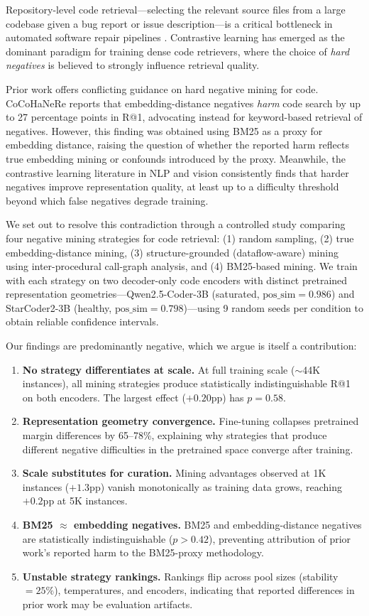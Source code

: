 \documentclass[11pt,a4paper]{article}
\begin{document}
Repository-level code retrieval---selecting the relevant source files from a large codebase given a bug report or issue description---is a critical bottleneck in automated software repair pipelines \cite{jimenez2024swebench}.
Contrastive learning has emerged as the dominant paradigm for training dense code retrievers, where the choice of \emph{hard negatives} is believed to strongly influence retrieval quality.

Prior work offers conflicting guidance on hard negative mining for code.
CoCoHaNeRe reports that embedding-distance negatives \emph{harm} code search by up to 27 percentage points in R@1, advocating instead for keyword-based retrieval of negatives.
However, this finding was obtained using BM25 as a proxy for embedding distance, raising the question of whether the reported harm reflects true embedding mining or confounds introduced by the proxy.
Meanwhile, the contrastive learning literature in NLP and vision consistently finds that harder negatives improve representation quality, at least up to a difficulty threshold beyond which false negatives degrade training.

We set out to resolve this contradiction through a controlled study comparing four negative mining strategies for code retrieval: (1) random sampling, (2) true embedding-distance mining, (3) structure-grounded (dataflow-aware) mining using inter-procedural call-graph analysis, and (4) BM25-based mining.
We train with each strategy on two decoder-only code encoders with distinct pretrained representation geometries---Qwen2.5-Coder-3B (saturated, $\text{pos\_sim}=0.986$) and StarCoder2-3B (healthy, $\text{pos\_sim}=0.798$)---using 9 random seeds per condition to obtain reliable confidence intervals.

Our findings are predominantly negative, which we argue is itself a contribution:

\begin{enumerate}
    \item \textbf{No strategy differentiates at scale.} At full training scale ($\sim$44K instances), all mining strategies produce statistically indistinguishable R@1 on both encoders. The largest effect ($+0.20$pp) has $p=0.58$.
    \item \textbf{Representation geometry convergence.} Fine-tuning collapses pretrained margin differences by 65--78\%, explaining why strategies that produce different negative difficulties in the pretrained space converge after training.
    \item \textbf{Scale substitutes for curation.} Mining advantages observed at 1K instances ($+1.3$pp) vanish monotonically as training data grows, reaching $+0.2$pp at 5K instances.
    \item \textbf{BM25 $\approx$ embedding negatives.} BM25 and embedding-distance negatives are statistically indistinguishable ($p > 0.42$), preventing attribution of prior work's reported harm to the BM25-proxy methodology.
    \item \textbf{Unstable strategy rankings.} Rankings flip across pool sizes (stability $= 25\%$), temperatures, and encoders, indicating that reported differences in prior work may be evaluation artifacts.
\end{enumerate}
\end{document}
